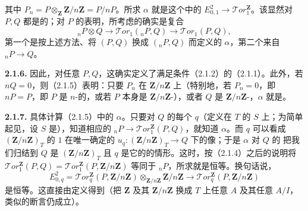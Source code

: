 其中 $P_n=P\otimes_{\mathbf Z}\mathbf Z/n\mathbf Z=P/nP$。所求 $\alpha$ 就是这个中的 $E^2_{0,1}\longrightarrow\mathcal Tor_1^{\mathbf Z}$。该显然对 $P,Q$ 都是的；对 $P$ 的表明，所考虑的确实是复合
\[{}_nP\otimes Q\longrightarrow\mathcal Tor_1({}_nP,Q)\longrightarrow\mathcal Tor_1(P,Q),\]
第一个是按上述方法、将 $(P,Q)$ 换成 $({}_nP,Q)$ 而定义的 $\alpha$，第二个来自 ${}_nP\longrightarrow Q$。

\textbf{2.1.6.} 因此，对任意 $P,Q$，这确实定义了满足条件（2.1.2）的（2.1.1）。此外，若 $nQ=0$，则（2.1.5）表明：只要 $P_n$ 在 $\mathbf Z/n\mathbf Z$ 上（特别地，若 $P_n=0$，即 $nP=P$，即 $P$ 是 $n$-的，或若 $P$ 本身是 $\mathbf Z/n\mathbf Z$-），或者 $Q$ 是 $\mathbf Z/n\mathbf Z$-，$\alpha$ 就是。

\textbf{2.1.7.} 具体计算（2.1.5）中的 $\alpha$。只要对 $Q$ 的每个 $q$（定义在 $T$ 的 $S$ 上；为简单起见，设 $S$ 是），知道相应的 ${}_nP\longrightarrow\mathcal Tor_1^{\mathbf Z}(P,Q)$，就知道 $\alpha$。而 $q$ 可以看成 $(\mathbf Z/n\mathbf Z)_T$ 的 $1$ 在唯一确定的 $u_q:(\mathbf Z/n\mathbf Z)_T\longrightarrow Q$ 下的像；于是 $\alpha$ 对 $Q$ 的
把我们归结到 $Q$ 是 $(\mathbf Z/n\mathbf Z)_T$ 且 $q$ 是它的的情形。这时，按（2.1.4）之后的说明将 $\mathcal Tor_1^{\mathbf Z}(P,Q)=\mathcal Tor_1^{\mathbf Z}(P,\mathbf Z/n\mathbf Z)$ 等同于 ${}_nP$，所求就是恒等。换句话说，
\[E^2_{0,q}=\mathcal Tor_q^{\mathbf Z}(P,\mathbf Z/n\mathbf Z)
\otimes_{\mathbf Z/n\mathbf Z}\mathbf Z/n\mathbf Z
\longrightarrow\mathcal Tor_q^{\mathbf Z}(P,\mathbf Z/n\mathbf Z)\]
是恒等。这直接由定义得到（把 $\mathbf Z$ 及其 $\mathbf Z/n\mathbf Z$ 换成 $T$ 上任意 $A$ 及其任意 $A/I$，类似的断言仍成立）。

